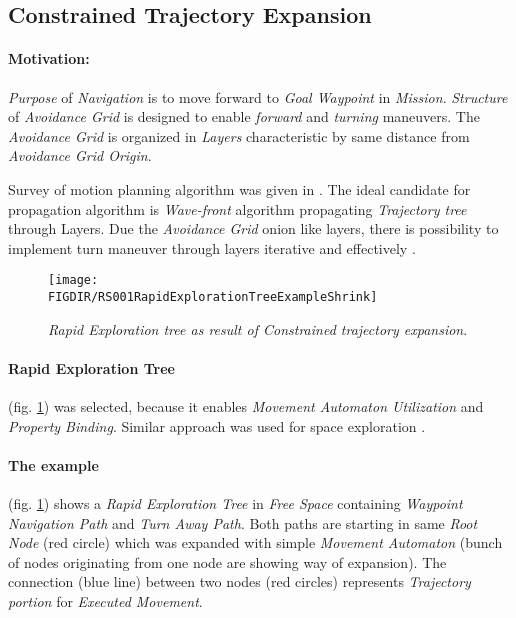 \subsection{Constrained Trajectory Expansion}\label{s:constrainedTrajectoryExpansion}

\paragraph{Motivation:} \emph{Purpose} of \emph{Navigation} is to move forward to \emph{Goal Waypoint} in \emph{Mission}. \emph{Structure} of \emph{Avoidance Grid} is designed to enable \emph{forward} and \emph{turning} maneuvers. The \emph{Avoidance Grid} is organized in \emph{Layers} characteristic by same distance from \emph{Avoidance Grid Origin}. 

Survey of motion planning algorithm was given in \cite{goerzen2009survey}. The ideal candidate for propagation algorithm is \emph{Wave-front} algorithm propagating \emph{Trajectory tree} through Layers. Due the \emph{Avoidance Grid} onion like layers, there is possibility to implement turn maneuver through layers iterative and effectively .

\begin{figure}[H]
    \centering
    \texttt{[image: \\FIGDIR/RS001RapidExplorationTreeExampleShrink]} 
    \caption{\emph{Rapid Exploration tree as result of \emph{Constrained trajectory expansion}}.}
    \label{fig:rapidExplorationTrajectoryTree}
\end{figure}

\paragraph{Rapid Exploration Tree} (fig. \ref{fig:rapidExplorationTrajectoryTree}) was selected, because it enables \emph{Movement Automaton Utilization} and \emph{Property Binding}. Similar approach was used for space exploration \cite{plaisant2002spacetree}. 

\paragraph{The example} (fig. \ref{fig:rapidExplorationTrajectoryTree}) shows a \emph{Rapid Exploration Tree} in \emph{Free Space} containing \emph{Waypoint Navigation Path} and \emph{Turn Away Path}. Both paths are starting in same \emph{Root Node} (red circle) which was expanded with simple \emph{Movement Automaton} (bunch of nodes originating from one node are showing way of expansion). The connection (blue line) between two nodes (red circles) represents \emph{Trajectory portion} for \emph{Executed Movement}.

